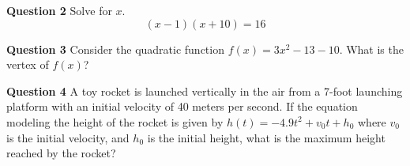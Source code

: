 \documentclass{beamer}
\begin{document}
%
%	
%	

\begin{frame}{\textbf{Question 2}}
	Solve for $x$.
\[(x-1)(x+10)=16\]
	
	\bigskip
	
%	
\end{frame}

\begin{frame}{\textbf{Question 3}}
	 Consider the quadratic function $f(x)= 3x^2-13-10$. What is the vertex of $f(x)$?
	
	\bigskip
	
%	
\end{frame}

\begin{frame}{\textbf{Question 4}}
	A toy rocket is launched vertically in the air from a 7-foot launching platform with an initial velocity of 40 meters per second. If the equation modeling the height of the rocket is given by $h(t)=-4.9t^2+v_0t+h_0$ where $v_0$ is the initial velocity, and $h_0$ is the initial height, what is the maximum height reached by the rocket?

	
%	
\end{frame}

%	
%	

%	
%	

\end{document}
